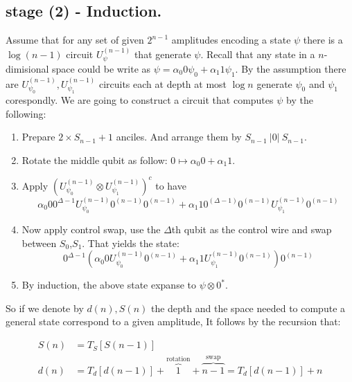 \documentclass[manuscript,screen,review]{acmart}
\begin{document}

\subsection{stage (2) - Induction.}

Assume that for any set of given $2^{n-1}$ amplitudes encoding a state $\psi$ there is a $\log(n-1)$ circuit $U_{\psi}^{(n-1)}$ that generate $\psi$. Recall that any state in a $n$-dimisional space could be write as $\psi = \alpha_{0} 0 \psi_{0} + \alpha_{1} 1 \psi_{1} $. By the assumption there are $U_{\psi_{0}}^{(n-1)},U_{\psi_{1}}^{(n-1)}$ circuits each at depth at most $\log n$ generate $\psi_{0}$ and $\psi_{1}$ corespondly. We are going to construct a circuit that computes $\psi$ by the following: 
\begin{enumerate}
  \item Prepare $2 \times S_{n-1} + 1$ anciles. And arrange them by $S_{n-1} \ |0| \ S_{n-1}$. 
  \item Rotate the middle qubit as follow: $ 0 \mapsto \alpha_{0} 0 + \alpha_{1} 1 $.   
  \item Apply $\left(U_{\psi_{0}}^{(n-1)} \otimes U_{\psi_{1}}^{(n-1)}\right)^{c} $ to have 
    \begin{equation*}
      \alpha_{0} 0 0^{\Delta -1} U_{\psi_{0}}^{(n-1)} 0^{(n-1)} 0^{(n-1)} + \alpha_{1} 1 0^{(\Delta - 1)}0^{(n-1)}U_{\psi_{1}}^{(n-1)}0^{(n-1)}
    \end{equation*}
  \item Now apply control swap, use the $\Delta$th qubit as the control wire and swap between $S_{0}$,$S_{1}$. That yields the state: 
    \begin{equation*} 0^{\Delta -1} \left(\alpha_{0} 0 U_{\psi_{0}}^{(n-1)} 0^{(n-1)} + \alpha_{1} 1 U_{\psi_{1}}^{(n-1)}0^{(n-1)} \right)0^{(n-1)} 
    \end{equation*}
\item By induction, the above state expanse to $\psi \otimes 0^{*}$.
\end{enumerate}
So if we denote by $d(n), S(n)$ the depth and the space needed to compute a general state correspond to a given amplitude, It follows by the recursion that: 

\begin{equation*}
\begin{split} 
S(n) &= T_{S}[S(n-1)]    \\
d(n) &= T_{d}[d(n-1)] + \overbrace{1}^{ \text{rotation} } + \overbrace{n-1}^{\text{swap}} =  T_{d}[d(n-1)] + n  
\end{split} 
\end{equation*}
\end{document}

